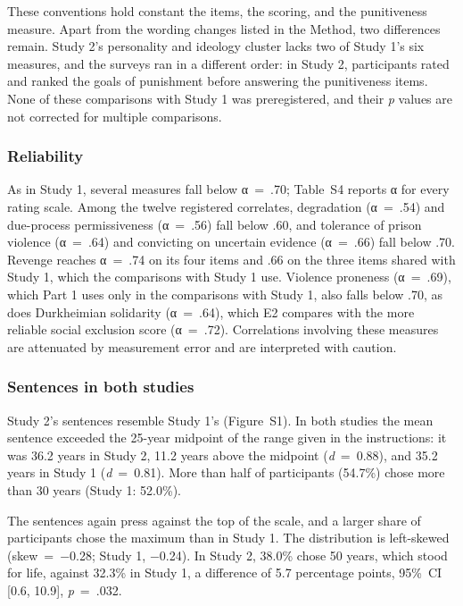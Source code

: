 These conventions hold constant the items, the scoring, and the punitiveness measure. Apart from the wording changes listed in the Method, two differences remain. Study 2's personality and ideology cluster lacks two of Study 1's six measures, and the surveys ran in a different order: in Study 2, participants rated and ranked the goals of punishment before answering the punitiveness items. None of these comparisons with Study 1 was preregistered, and their \emph{p} values are not corrected for multiple comparisons.

\subsubsection{Reliability}\label{reliability}

As in Study 1, several measures fall below α~=~.70; Table~S4 reports α for every rating scale. Among the twelve registered correlates, degradation (α~=~.54) and due-process permissiveness (α~=~.56) fall below .60, and tolerance of prison violence (α~=~.64) and convicting on uncertain evidence (α~=~.66) fall below .70. Revenge reaches α~=~.74 on its four items and .66 on the three items shared with Study 1, which the comparisons with Study 1 use. Violence proneness (α~=~.69), which Part 1 uses only in the comparisons with Study 1, also falls below .70, as does Durkheimian solidarity (α~=~.64), which E2 compares with the more reliable social exclusion score (α~=~.72). Correlations involving these measures are attenuated by measurement error and are interpreted with caution.

\subsubsection{Sentences in both studies}\label{sentences-in-both-studies}

Study 2's sentences resemble Study 1's (Figure~S1). In both studies the mean sentence exceeded the 25-year midpoint of the range given in the instructions: it was 36.2 years in Study 2, 11.2 years above the midpoint (\emph{d}~=~0.88), and 35.2 years in Study 1 (\emph{d}~=~0.81). More than half of participants (54.7\%) chose more than 30 years (Study 1: 52.0\%).

The sentences again press against the top of the scale, and a larger share of participants chose the maximum than in Study 1. The distribution is left-skewed (skew~=~−0.28; Study 1, −0.24). In Study 2, 38.0\% chose 50 years, which stood for life, against 32.3\% in Study 1, a difference of 5.7 percentage points, 95\%~CI {[}0.6, 10.9{]}, \emph{p}~=~.032.


